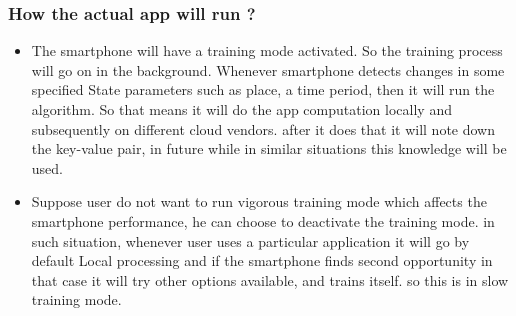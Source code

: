 \documentclass[12pt]{report}
\begin{document}
\begin{comment}
\subsubsection{Scenario 2}
In the previous scenario we do not have multiple steps of reinforcements. RL also works in the situation where we have different stages and steps for example in a tic-tac-toe game or even chess. So the previous scenario does not exploit the multiple step option available with RL.\par
In this second scenario we can envision a situation where we need to further choose from right actions after we have decided whether to offload or not, for example after offloading we might lower the CPU frequency rate of the device to lower the battery consumption, or after offloading we can choose for a specific service that is being offered by the Commercial server provider to get the best of what is available with us and so on.\par
We can also add time factor as a parameter as sometimes it is seen that the internet speed or performance varies depending which part of day we are using it (because of varying load of users).
\end{comment}


\subsubsection{ How the actual app will run ?}
\begin{itemize}
\item The smartphone will have a training mode activated. So the training 
process will go on in the background. Whenever smartphone detects changes in 
some specified State parameters such as place, a time period, then it will run 
the algorithm. So that means it will do the app computation locally and subsequently 
on different cloud vendors. after it does that it will note down the key-value
pair, in future while in similar situations this knowledge will be used.

\item Suppose user do not want to run vigorous training mode which
affects the smartphone performance, he can choose to deactivate the training
mode. in such situation, whenever user uses a particular application it will 
go by default Local processing and if the smartphone finds second opportunity in that case it will try 
other options available, and trains itself. so this is in slow training mode.
\end{itemize}
\end{document}
